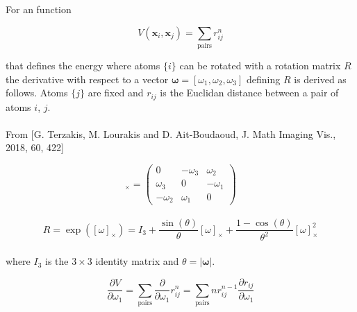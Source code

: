 \documentclass[10pt]{article}
\begin{document}
For an function

\begin{equation}
V(\boldsymbol{x}_i, \boldsymbol{x}_j) = \sum_{\text{pairs}} r_{ij}^n
\end{equation}

that defines the energy where atoms $\{i\}$ can be rotated with a rotation matrix $R$ the derivative with respect to  a vector $\boldsymbol{\omega} = [\omega_1, \omega_2, \omega_3]$ defining $R$ is derived as follows. Atoms $\{j\}$ are fixed and $r_{ij}$ is the Euclidan distance between a pair of atoms $i$, $j$.
\\\\
 From [G. Terzakis, M. Lourakis and D. Ait-Boudaoud, J. Math Imaging Vis., 2018, 60, 422]

\begin{equation}
[\omega]_\times = \begin{pmatrix}
 0 & -\omega_3 & \omega_2 \\
 \omega_3 & 0 & -\omega_1 \\
 -\omega_2 & \omega_1 & 0
\end{pmatrix}
\end{equation}
\\
\begin{equation}
R = \exp([\omega]_\times) = {I}_3 + \frac{\sin(\theta)}{\theta} [\omega]_\times + \frac{1 - \cos(\theta)}{\theta^2} [\omega]_\times^2
\end{equation}
\\
where $I_3$ is the $3\times3$ identity matrix and $\theta = |\boldsymbol{\omega}|$.

\begin{equation}
\frac{\partial V}{\partial \omega_1} =  \sum_{\text{pairs}} \frac{\partial }{\partial \omega_1} r_{ij}^n = \sum_{\text{pairs}} n r_{ij}^{n-1}  \frac{\partial r_{ij}}{\partial \omega_1}
\end{equation}
\end{document}
